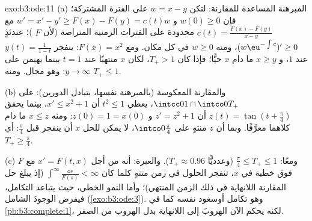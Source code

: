 \begin{solution}{exo:b3:ode:11}
(a) المبرهنة المساعدة للمقارنة: لتكن $w = x - y$ على الفترة
المشتركة؛ فإن $w(0) \geq 0$ و $w' = x' - y' \geq F(x) - F(y) =
c(t)w$ مع $c(t) = \frac{F(x) - F(y)}{x - y}$ محدودة على
الفترات الزمنية المتراصة (لأن $F$ )؛ عندئذٍ
$(w\eu^{-\int c})' \geq 0$، ومنه $w \geq 0$ في كل مكان. ومع $F(x) = x^2$: ينفجر
$y(t) = \frac1{1 - t}$ عند $1$، و $x
\geq y$ ما دام $x$ حيًّا؛ فإذا كان $T_+ > 1$،
لكان $x$ منتهيًا عند $t = 1$ بينما يهيمن على $y \to \infty$:
وهو محال. ومنه $T_+ \leq 1$.

(b) والمقارنة المعكوسة (بالمبرهنة نفسها، بتبادل الدورين): على
$\intcc01\cap\intco0{T_+}$، يعطي $t^2 \leq 1$ أن $x' \leq
x^2 + 1$، بينما يحقق $z(t) = \tan(t + \frac\pi4)$ أن
$z' =
z^2 + 1$ و $z(0) = 1 = x(0)$: ومنه $x \leq z$ ما دام كلاهما معرَّفًا. وبما
أن $z$ منتهٍ على $\intco0{\frac\pi4}$، لا يمكن للحل $x$ أن ينفجر قبل
$\frac\pi4$: أي $T_+ \geq \frac\pi4$.

(c) ومعًا: $\frac\pi4 \leq T_+ \leq 1$ (وعدديًّا $T_+
\approx 0.96$). والعبرة: أنه من أجل
$x' = F(t, x)$ مع $F$ فوق خطية في $x$، تنفجر الحلول في زمن
منتهٍ كلما كان $\int^\infty\frac{\dd s}{F(s)} < \infty$ (إذ يبلغ حل المقارنة اللانهاية في ذلك
الزمن المنتهي)؛ وأما النمو الخطي، حيث يتباعد التكامل، فيفرض
الوجودَ الشامل (\cref{exo:b3:ode:3}). وهو تكامل أوسغود نفسه كما في
\cref{pb:b3:complete:1}، لكنه يحكم الآن الهروبَ إلى اللانهاية بدل الهروب من
الصفر.
\end{solution}

